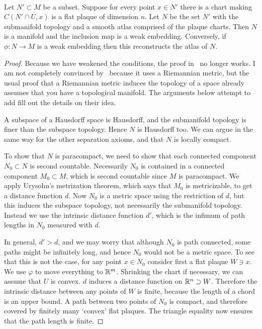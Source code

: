 \begin{theorem}
\label{thm:weakly embedded submanifold}
\textup{\cite[Thm~1.2.7]{Sharpe1997}\cite[Lems~I.2.15--17]{Kolar1993}} \\
Let $N' \subset M$ be a subset.
Suppose for every point $x \in N'$ there is a chart making $C(N'\cap U,x)$ is a flat plaque of dimension $n$.
Let $N$ be the set $N'$ with the submanifold topology and a smooth atlas comprised of the plaque charts.
Then $N$ is a manifold and the inclusion map is a weak embedding.
Conversely, if $\phi : N \to M$ is a weak embedding then this reconstructs the atlas of $N$.
\end{theorem}
\begin{proof}
Because we have weakened the conditions, the proof in~\cite[Thm~1.2.7(i)]{Sharpe1997} no longer works.
I am not completely convinced by~\cite[Lems~I.2.15--17]{Kolar1993} because it uses a Riemannian metric, but the usual proof that a Riemannian metric induces the topology of a space already assumes that you have a topological manifold.
The arguments below attempt to add fill out the details on their idea.

A subspace of a Hausdorff space is Hausdorff, and the submanifold topology is finer than the subspace topology.
Hence $N$ is Hausdorff too.
We can argue in the same way for the other separation axioms, and that $N$ is locally compact.

To show that $N$ is paracompact, we need to show that each connected component $N_0 \subset N$ is second countable.
Necessarily $N_0$ is contained in a connected component $M_0 \subset M$, which is second countable since $M$ is paracompact.
We apply Urysohn's metrization theorem, which says that $M_0$ is metricizable, to get a distance function $d$.
Now $N_0$ is a metric space using the restriction of $d$, but this induces the subspace topology, not necessarily the submanifold topology.
Instead we use the intrinsic distance function $d'$, which is the infimum of path lengths in $N_0$ measured with $d$.

In general, $d' > d$, and we may worry that although $N_0$ is path connected, some paths might be infinitely long, and hence $N_0$ would not be a metric space.
To see that this is not the case, for any point $x \in N_0$ consider first a flat plaque $W \ni x$.
We use $\varphi$ to move everything to $\mathbb{R}^m$.
Shrinking the chart if necessary, we can assume that $U$ is convex.
$d$ induces a distance function on $\mathbb{R}^n \supset W$.
Therefore the intrinsic distance between any points of $W$ is finite, because the length of a chord is an upper bound.
A path between two points of $N_0$ is compact, and therefore covered by finitely many `convex' flat plaques.
The triangle equality now ensures that the path length is finite.


\end{proof}
